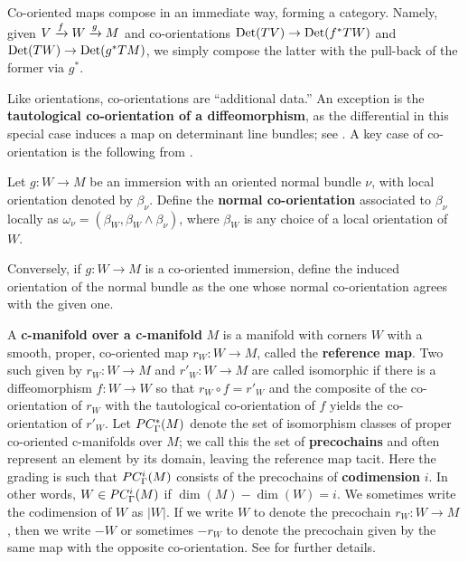 Co-oriented maps compose in an immediate way, forming a category.
Namely, given $V \xrightarrow{f} W \xrightarrow{g} M$ and co-orientations ${\rm Det}(TV) \to {\rm Det}(f^*TW)$ and ${\rm Det}(TW)\to {\rm Det}(g^*TM)$, we simply compose the latter with the pull-back of the former via $g^*$.

Like orientations, co-orientations are ``additional data.''
An exception is the {\bf tautological co-orientation of a diffeomorphism}, as the differential
in this special case induces a map on determinant line bundles; see \cite[Definition 3.14]{medina2022foundations}.
A key case of co-orientation is the following from \cite[Section 3.3]{medina2022foundations}.

\begin{definition}\label{D:normal co-or}
	Let $g \colon W \to M$ be an immersion with an oriented normal bundle $\nu$, with local orientation denoted by $\beta_\nu$.
	Define the \textbf{normal co-orientation} associated to $\beta_\nu$ locally as $\omega_{\nu} = (\beta_W, \beta_W \wedge \beta_\nu)$, where	$\beta_W$ is any choice of a local orientation of $W$.

	Conversely, if $g \colon W \to M$ is a co-oriented immersion, define the induced orientation of the normal bundle as the one whose normal co-orientation	agrees with the given one.
\end{definition}

\begin{definition}\label{V: maps are co-oriented}
	A \textbf{c-manifold over a c-manifold} $M$ is a
	manifold with corners $W$ with a smooth, proper, co-oriented map $r_W \colon W \to M$, called the \textbf{reference map}.
	Two such given by $r_W \colon W \to M$ and $r'_W \colon W \to M$ are called isomorphic if there is a diffeomorphism $f \colon W \to W$ so that $r_W \circ f = r'_W$ and the composite of the co-orientation of $r_W$ with the tautological co-orientation of $f$ yields the co-orientation of $r'_W$.
	Let $PC_\Gamma^*(M)$ denote the set of isomorphism classes of proper co-oriented c-manifolds over $M$; we call this the set of \textbf{precochains} and often represent an element by its domain, leaving the reference map tacit.
	Here the grading is such that $PC_\Gamma^i(M)$ consists of the precochains of \textbf{codimension} $i$.
	In other words, $W \in PC_\Gamma^i(M)$ if $\dim(M)-\dim(W) = i$.
	We sometimes write the codimension of $W$ as $|W|$.
	If we write $W$ to denote the precochain $r_W \colon W \to M$, then we write $-W$ or sometimes $-r_W$ to denote the precochain given by the same map with the opposite co-orientation.
	See \cite[Section 4.2]{medina2022foundations} for further details.
\end{definition}


